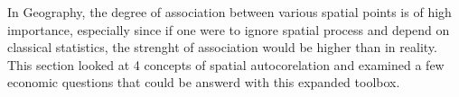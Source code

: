 \documentclass[12pt,letterpaper,notitlepage,onecolumn,final,openbib]{article}
\begin{document}
	In Geography, the degree of association between various spatial points is of high importance, especially since if one were to ignore spatial process and depend on classical statistics, the strenght of association would be higher than in reality.   This section looked at 4 concepts of spatial autocorelation and examined a few economic questions that could be answerd with this expanded toolbox.  
	
	
	\pagebreak
	
	
\end{document}
